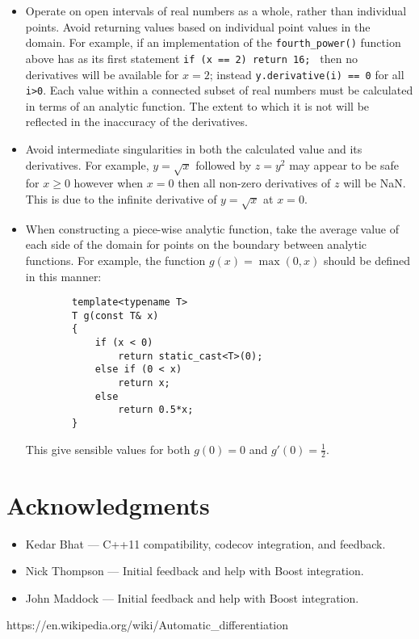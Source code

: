 \documentclass{article}
\begin{document}
\begin{itemize}
\item Operate on open intervals of real numbers as a whole, rather than individual points.  Avoid
returning values based on individual point values in the domain.  For example, if an implementation of the
{\tt fourth\_power()} function above has as its first statement {\tt if (x == 2) return 16; } then no
derivatives will be available for $x=2$; instead {\tt y.derivative(i) == 0} for all {\tt i>0}. Each value within a
connected subset of real numbers must be calculated in terms of an analytic function. The extent to which it is not
will be reflected in the inaccuracy of the derivatives.
\item Avoid intermediate singularities in both the calculated value and its derivatives. For example, $y=\sqrt{x}$
followed by $z=y^2$ may appear to be safe for $x\ge0$ however when $x=0$ then all non-zero derivatives of $z$ will
be NaN. This is due to the infinite derivative of $y=\sqrt{x}$ at $x=0$.
\item When constructing a piece-wise analytic function, take the average value of each side of the domain for points
on the boundary between analytic functions. For example, the function $g(x) = \max(0,x)$ should be
defined in this manner:
    \begin{verbatim}
        template<typename T>
        T g(const T& x)
        {
            if (x < 0)
                return static_cast<T>(0);
            else if (0 < x)
                return x;
            else
                return 0.5*x;
        }
    \end{verbatim}
This give sensible values for both $g(0)=0$ and $g'(0)=\frac{1}{2}$.
\end{itemize}

\section{Acknowledgments}

\begin{itemize}
\item Kedar Bhat --- C++11 compatibility, codecov integration, and feedback.
\item Nick Thompson --- Initial feedback and help with Boost integration.
\item John Maddock --- Initial feedback and help with Boost integration.
\end{itemize}


\begin{thebibliography}{1}
 https://en.wikipedia.org/wiki/Automatic\_differentiation
\end{thebibliography}
\end{document}
